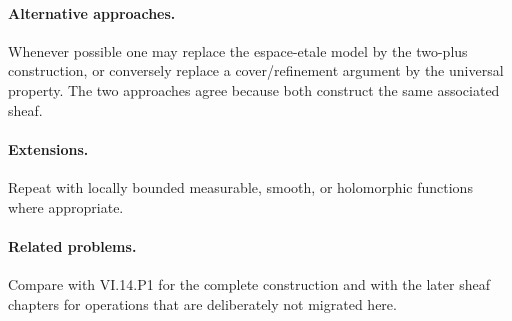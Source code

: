 \paragraph{Alternative approaches.}
Whenever possible one may replace the espace-etale model by the two-plus construction, or conversely replace a cover/refinement argument by the universal property.  The two approaches agree because both construct the same associated sheaf.

\paragraph{Extensions.}
Repeat with locally bounded measurable, smooth, or holomorphic functions where appropriate.

\paragraph{Related problems.}
Compare with VI.14.P1 for the complete construction and with the later sheaf chapters for operations that are deliberately not migrated here.
\fi

